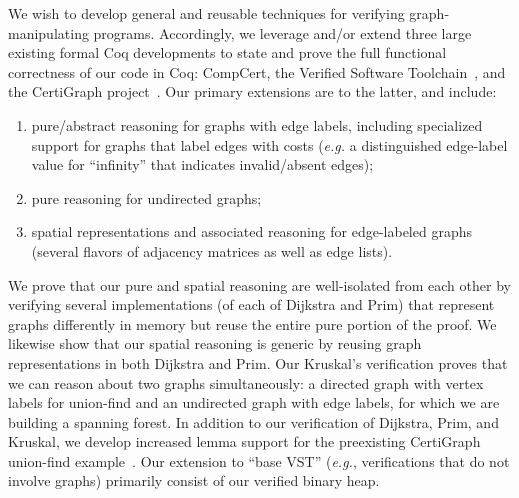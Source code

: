 We wish to develop general and reusable techniques for verifying graph-manipulating programs.  Accordingly, we leverage and/or extend three large existing formal Coq developments to state and prove the full functional correctness of our code in Coq: CompCert, the Verified Software Toolchain~\cite{appel:programlogics}, and the CertiGraph project~\cite{DBLP:journals/pacmpl/WangCMH19}.  Our primary extensions are to the latter, and include:
\begin{enumerate}
\item pure/abstract reasoning for graphs with edge labels, including specialized support for graphs that label edges with costs (\emph{e.g.} a distinguished edge-label value for ``infinity'' that indicates invalid/absent edges);
\item pure reasoning for undirected graphs;
\item spatial representations and associated reasoning for edge-labeled graphs (several flavors of adjacency matrices as well as edge lists).
\end{enumerate}
We prove that our pure and spatial reasoning are well-isolated from each other by verifying several implementations (of each of Dijkstra and Prim) that represent graphs differently in memory but reuse the entire pure portion of the proof.  We likewise show that our spatial reasoning is generic by reusing graph representations in both Dijkstra and Prim.  Our Kruskal's verification proves that we can reason about two graphs simultaneously: a directed graph with vertex labels for union-find and an undirected graph with edge labels, for which we are building a spanning forest.
In addition to our verification of Dijkstra, Prim, and Kruskal, we develop increased lemma support for the preexisting CertiGraph union-find example~\cite{DBLP:journals/pacmpl/WangCMH19}.  Our extension to ``base VST'' (\emph{e.g.}, verifications that do not involve graphs) primarily consist of our verified binary heap.



